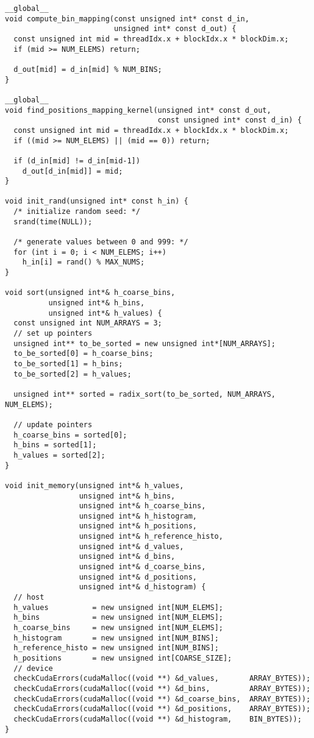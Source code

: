 \begin{lstlisting}[captionpos=t, xleftmargin=0.0pt, xrightmargin=0.0pt, caption={Coarse Histogram implementation}, label={lst:coarse histogram impl}]
__global__
void compute_bin_mapping(const unsigned int* const d_in,
                         unsigned int* const d_out) {
  const unsigned int mid = threadIdx.x + blockIdx.x * blockDim.x;
  if (mid >= NUM_ELEMS) return;

  d_out[mid] = d_in[mid] % NUM_BINS;
}

__global__
void find_positions_mapping_kernel(unsigned int* const d_out,
                                   const unsigned int* const d_in) {
  const unsigned int mid = threadIdx.x + blockIdx.x * blockDim.x;
  if ((mid >= NUM_ELEMS) || (mid == 0)) return;

  if (d_in[mid] != d_in[mid-1])
    d_out[d_in[mid]] = mid;
}

void init_rand(unsigned int* const h_in) {
  /* initialize random seed: */
  srand(time(NULL));

  /* generate values between 0 and 999: */
  for (int i = 0; i < NUM_ELEMS; i++)
    h_in[i] = rand() % MAX_NUMS;
}

void sort(unsigned int*& h_coarse_bins, 
          unsigned int*& h_bins, 
          unsigned int*& h_values) {
  const unsigned int NUM_ARRAYS = 3;
  // set up pointers
  unsigned int** to_be_sorted = new unsigned int*[NUM_ARRAYS];
  to_be_sorted[0] = h_coarse_bins;
  to_be_sorted[1] = h_bins;
  to_be_sorted[2] = h_values;

  unsigned int** sorted = radix_sort(to_be_sorted, NUM_ARRAYS, NUM_ELEMS);

  // update pointers
  h_coarse_bins = sorted[0];
  h_bins = sorted[1];
  h_values = sorted[2];
}

void init_memory(unsigned int*& h_values,
                 unsigned int*& h_bins,
                 unsigned int*& h_coarse_bins,
                 unsigned int*& h_histogram,
                 unsigned int*& h_positions,
                 unsigned int*& h_reference_histo,
                 unsigned int*& d_values,
                 unsigned int*& d_bins,
                 unsigned int*& d_coarse_bins,
                 unsigned int*& d_positions,
                 unsigned int*& d_histogram) {
  // host
  h_values          = new unsigned int[NUM_ELEMS];
  h_bins            = new unsigned int[NUM_ELEMS];
  h_coarse_bins     = new unsigned int[NUM_ELEMS];
  h_histogram       = new unsigned int[NUM_BINS];
  h_reference_histo = new unsigned int[NUM_BINS];
  h_positions       = new unsigned int[COARSE_SIZE];
  // device
  checkCudaErrors(cudaMalloc((void **) &d_values,       ARRAY_BYTES));
  checkCudaErrors(cudaMalloc((void **) &d_bins,         ARRAY_BYTES));
  checkCudaErrors(cudaMalloc((void **) &d_coarse_bins,  ARRAY_BYTES));
  checkCudaErrors(cudaMalloc((void **) &d_positions,    ARRAY_BYTES));
  checkCudaErrors(cudaMalloc((void **) &d_histogram,    BIN_BYTES));
}


\end{lstlisting}
